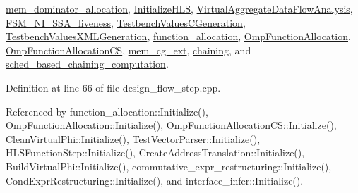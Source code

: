 \hyperlink{classmem__dominator__allocation_a742ee8ca37f2b4123e62b365fa524016}{mem\+\_\+dominator\+\_\+allocation}, \hyperlink{classInitializeHLS_ae1674f8063ae4a38affcf5d2ca3ede18}{Initialize\+H\+LS}, \hyperlink{classVirtualAggregateDataFlowAnalysis_acafa9a90b201923d66a16fea72ccc9ac}{Virtual\+Aggregate\+Data\+Flow\+Analysis}, \hyperlink{classFSM__NI__SSA__liveness_a36cbd84735c2126d760d7fbdadab9d5e}{F\+S\+M\+\_\+\+N\+I\+\_\+\+S\+S\+A\+\_\+liveness}, \hyperlink{classTestbenchValuesCGeneration_a9cd290bc7ce4f2ada56343231d3341e2}{Testbench\+Values\+C\+Generation}, \hyperlink{classTestbenchValuesXMLGeneration_a33f05a86d9767b3503b981d95ae7d604}{Testbench\+Values\+X\+M\+L\+Generation}, \hyperlink{classfunction__allocation_a48d784232dd4383a11ff009a3cd78b30}{function\+\_\+allocation}, \hyperlink{classOmpFunctionAllocation_a7ed35644fe18a1430f3bcf546bef1c1a}{Omp\+Function\+Allocation}, \hyperlink{classOmpFunctionAllocationCS_a6c97b4f87a09796aa43a387460348315}{Omp\+Function\+Allocation\+CS}, \hyperlink{classmem__cg__ext_a5899173716bbaa87a39603a1847f4ff6}{mem\+\_\+cg\+\_\+ext}, \hyperlink{classchaining_a2ec8eacb120c33974ba7829842910880}{chaining}, and \hyperlink{classsched__based__chaining__computation_a86daa9b72e0e2d9a939e80aa22055d4e}{sched\+\_\+based\+\_\+chaining\+\_\+computation}.



Definition at line 66 of file design\+\_\+flow\+\_\+step.\+cpp.



Referenced by function\+\_\+allocation\+::\+Initialize(), Omp\+Function\+Allocation\+::\+Initialize(), Omp\+Function\+Allocation\+C\+S\+::\+Initialize(), Clean\+Virtual\+Phi\+::\+Initialize(), Test\+Vector\+Parser\+::\+Initialize(), H\+L\+S\+Function\+Step\+::\+Initialize(), Create\+Address\+Translation\+::\+Initialize(), Build\+Virtual\+Phi\+::\+Initialize(), commutative\+\_\+expr\+\_\+restructuring\+::\+Initialize(), Cond\+Expr\+Restructuring\+::\+Initialize(), and interface\+\_\+infer\+::\+Initialize().

